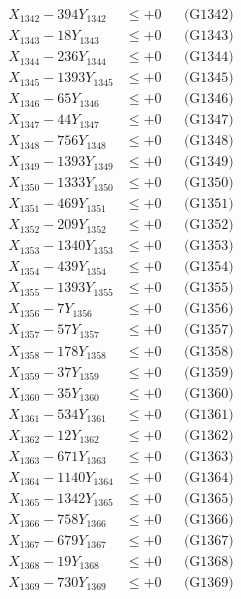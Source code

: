 \documentclass[a4paper,10pt]{article}
\begin{document}
{\begin{align}
X_{1342} - 394Y_{1342} &\leq +0 && \text{(G1342)} \\
X_{1343} - 18Y_{1343} &\leq +0 && \text{(G1343)} \\
X_{1344} - 236Y_{1344} &\leq +0 && \text{(G1344)} \\
X_{1345} - 1393Y_{1345} &\leq +0 && \text{(G1345)} \\
X_{1346} - 65Y_{1346} &\leq +0 && \text{(G1346)} \\
X_{1347} - 44Y_{1347} &\leq +0 && \text{(G1347)} \\
X_{1348} - 756Y_{1348} &\leq +0 && \text{(G1348)} \\
X_{1349} - 1393Y_{1349} &\leq +0 && \text{(G1349)} \\
X_{1350} - 1333Y_{1350} &\leq +0 && \text{(G1350)} \\
\allowbreak
X_{1351} - 469Y_{1351} &\leq +0 && \text{(G1351)} \\
X_{1352} - 209Y_{1352} &\leq +0 && \text{(G1352)} \\
X_{1353} - 1340Y_{1353} &\leq +0 && \text{(G1353)} \\
X_{1354} - 439Y_{1354} &\leq +0 && \text{(G1354)} \\
X_{1355} - 1393Y_{1355} &\leq +0 && \text{(G1355)} \\
X_{1356} - 7Y_{1356} &\leq +0 && \text{(G1356)} \\
X_{1357} - 57Y_{1357} &\leq +0 && \text{(G1357)} \\
X_{1358} - 178Y_{1358} &\leq +0 && \text{(G1358)} \\
X_{1359} - 37Y_{1359} &\leq +0 && \text{(G1359)} \\
X_{1360} - 35Y_{1360} &\leq +0 && \text{(G1360)} \\
\allowbreak
X_{1361} - 534Y_{1361} &\leq +0 && \text{(G1361)} \\
X_{1362} - 12Y_{1362} &\leq +0 && \text{(G1362)} \\
X_{1363} - 671Y_{1363} &\leq +0 && \text{(G1363)} \\
X_{1364} - 1140Y_{1364} &\leq +0 && \text{(G1364)} \\
X_{1365} - 1342Y_{1365} &\leq +0 && \text{(G1365)} \\
X_{1366} - 758Y_{1366} &\leq +0 && \text{(G1366)} \\
X_{1367} - 679Y_{1367} &\leq +0 && \text{(G1367)} \\
X_{1368} - 19Y_{1368} &\leq +0 && \text{(G1368)} \\
X_{1369} - 730Y_{1369} &\leq +0 && \text{(G1369)} \\

\end{align}}
\end{document}
